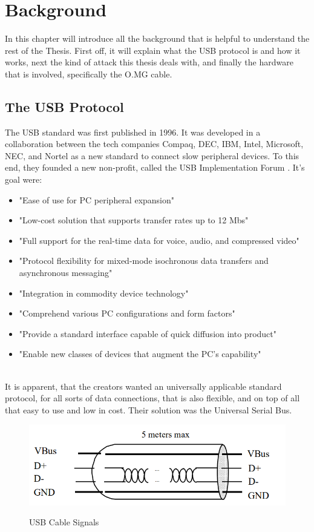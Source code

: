 \chapter{Background}


In this chapter will introduce all the background that is helpful to understand the rest of the Thesis. 
First off, it will explain what the USB protocol is and how it works, next the kind of attack this thesis deals with, and finally the hardware that is involved, specifically the O.MG cable. 

\section{The USB Protocol} \label{TheUSBProtocol}

The USB standard \cite{WaybackMachine2018} was first published in 1996. It was developed in a collaboration between the tech companies Compaq, DEC, IBM, Intel, Microsoft, NEC, and Nortel as a new standard to connect slow peripheral devices. To this end, they founded a new non-profit, called the USB Implementation Forum \cite{USBIFUSBIF}. It's goal were:
\begin{itemize}
    \item "Ease of use for PC peripheral expansion"
    \item "Low-cost solution that supports transfer rates up to 12 Mbs"
    \item "Full support for the real-time data for voice, audio, and compressed video"
    \item "Protocol flexibility for mixed-mode isochronous data transfers and asynchronous messaging"
    \item "Integration in commodity device technology"
    \item "Comprehend various PC configurations and form factors"
    \item "Provide a standard interface capable of quick diffusion into product"
    \item "Enable new classes of devices that augment the PC's capability"  
\end{itemize}
\cite[p.~23]{WaybackMachine2018}\\
It is apparent, that the creators wanted an universally applicable standard protocol, for all sorts of data connections, that is also flexible, and on top of all that easy to use and low in cost. Their solution was the Universal Serial Bus.

\begin{figure}
    \centering
    \includegraphics[width=0.5\linewidth]{usbsingalgraphic.png}
    \caption{USB Cable Signals}
    \label{fig:usbsingalgraphic}
    \cite{WaybackMachine2018}
\end{figure}

